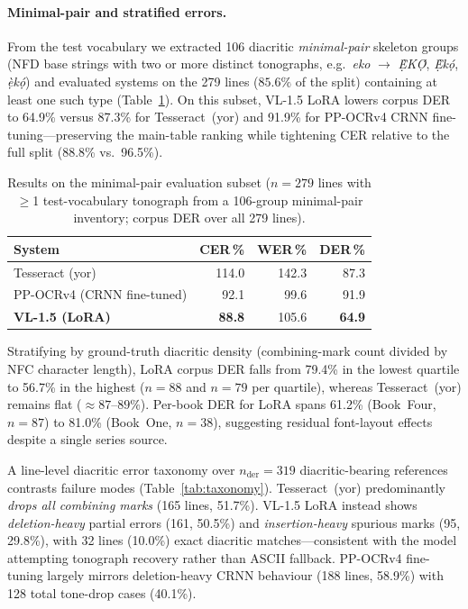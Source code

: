 \documentclass{article}
\begin{document}
\paragraph{Minimal-pair and stratified errors.}
From the test vocabulary we extracted 106 diacritic \emph{minimal-pair} skeleton groups (NFD base strings with two or more distinct tonographs, e.g.\ \textit{eko} $\rightarrow$ \textit{Ẹ̀KỌ́}, \textit{Ẹ̀kọ́}, \textit{ẹ̀kọ́}) and evaluated systems on the 279 lines ($85.6\%$ of the split) containing at least one such type (Table~\ref{tab:minimal}). On this subset, VL-1.5 LoRA lowers corpus DER to 64.9\% versus 87.3\% for Tesseract~(yor) and 91.9\% for PP-OCRv4 CRNN fine-tuning---preserving the main-table ranking while tightening CER relative to the full split (88.8\% vs.\ 96.5\%).

\begin{table}[t]
  \centering
  \small
  \begin{tabular}{lrrr}
    \toprule
    System & CER\,\% & WER\,\% & DER\,\% \\
    \midrule
    Tesseract (yor) & 114.0 & 142.3 & 87.3 \\
    PP-OCRv4 (CRNN fine-tuned) & 92.1 & 99.6 & 91.9 \\
    \textbf{VL-1.5 (LoRA)} & \textbf{88.8} & 105.6 & \textbf{64.9} \\
    \bottomrule
  \end{tabular}
  \caption{Results on the minimal-pair evaluation subset ($n{=}279$ lines with $\geq$1 test-vocabulary tonograph from a 106-group minimal-pair inventory; corpus DER over all 279 lines).}
  \label{tab:minimal}
\end{table}

Stratifying by ground-truth diacritic density (combining-mark count divided by NFC character length), LoRA corpus DER falls from 79.4\% in the lowest quartile to 56.7\% in the highest ($n{=}88$ and $n{=}79$ per quartile), whereas Tesseract~(yor) remains flat (${\approx}87$--$89\%$). Per-book DER for LoRA spans 61.2\% (Book~Four, $n{=}87$) to 81.0\% (Book~One, $n{=}38$), suggesting residual font-layout effects despite a single series source.

A line-level diacritic error taxonomy over $n_{\mathrm{der}}{=}319$ diacritic-bearing references contrasts failure modes (Table~\ref{tab:taxonomy}). Tesseract~(yor) predominantly \emph{drops all combining marks} (165 lines, 51.7\%). VL-1.5 LoRA instead shows \emph{deletion-heavy} partial errors (161, 50.5\%) and \emph{insertion-heavy} spurious marks (95, 29.8\%), with 32 lines (10.0\%) exact diacritic matches---consistent with the model attempting tonograph recovery rather than ASCII fallback. PP-OCRv4 fine-tuning largely mirrors deletion-heavy CRNN behaviour (188 lines, 58.9\%) with 128 total tone-drop cases (40.1\%).
\end{document}
